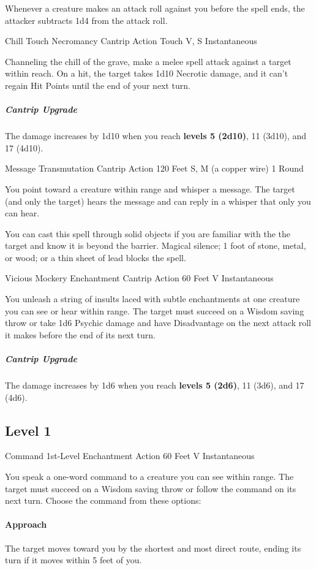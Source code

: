\documentclass[letterpaper,openany,oneside,twocolumn]{book}
\begin{document}
Whenever a creature makes an attack roll against you before the spell ends, the attacker subtracts 1d4 from the attack roll.

\DndSpellHeader
  {Chill Touch}
  {Necromancy Cantrip}
  {Action}
  {Touch}
  {V, S}
  {Instantaneous}

Channeling the chill of the grave, make a melee spell attack against a target within reach. On a hit, the target takes 1d10 Necrotic damage, and it can't regain Hit Points until the end of your next turn.

\subparagraph*{Cantrip Upgrade} The damage increases by 1d10 when you reach \textbf{levels 5 (2d10)}, 11 (3d10), and 17 (4d10).

\DndSpellHeader
  {Message}
  {Transmutation Cantrip}
  {Action}
  {120 Feet}
  {S, M (a copper wire)}
  {1 Round}

You point toward a creature within range and whisper a message. The target (and only the target) hears the message and can reply in a whisper that only you can hear.

You can cast this spell through solid objects if you are familiar with the the target and know it is beyond the barrier. Magical silence; 1 foot of stone, metal, or wood; or a thin sheet of lead blocks the spell.

\DndSpellHeader
  {Vicious Mockery}
  {Enchantment Cantrip}
  {Action}
  {60 Feet}
  {V}
  {Instantaneous}

You unleash a string of insults laced with subtle enchantments at one creature you can see or hear within range. The target must succeed on a Wisdom saving throw or take 1d6 Psychic damage and have Disadvantage on the next attack roll it makes before the end of its next turn.

\subparagraph*{Cantrip Upgrade} The damage increases by 1d6 when you reach \textbf{levels 5 (2d6)}, 11 (3d6), and 17 (4d6).

\subsection*{Level 1}

\DndSpellHeader
  {Command}
  {1st-Level Enchantment}
  {Action}
  {60 Feet}
  {V}
  {Instantaneous}

You speak a one-word command to a creature you can see within range. The target must succeed on a Wisdom saving throw or follow the command on its next turn. Choose the command from these options:

\paragraph*{Approach} The target moves toward you by the shortest and most direct route, ending its turn if it moves within 5 feet of you.
\end{document}
